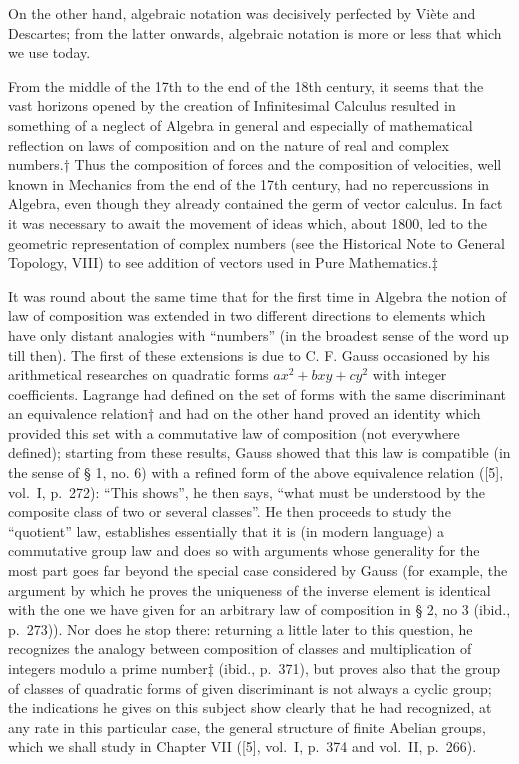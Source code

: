 On the other hand, algebraic notation was decisively perfected by Viète and Descartes; from the latter onwards, algebraic notation is more or less that which we use today.

From the middle of the 17th to the end of the 18th century, it seems that the vast horizons opened by the creation of Infinitesimal Calculus resulted in something of a neglect of Algebra in general and especially of mathematical reflection on laws of composition and on the nature of real and complex numbers.† Thus the composition of forces and the composition of velocities, well known in Mechanics from the end of the 17th century, had no repercussions in Algebra, even though they already contained the germ of vector calculus. In fact it was necessary to await the movement of ideas which, about 1800, led to the geometric representation of complex numbers (see the Historical Note to General Topology, VIII) to see addition of vectors used in Pure Mathematics.‡

It was round about the same time that for the first time in Algebra the notion of law of composition was extended in two different directions to elements which have only distant analogies with ``numbers'' (in the broadest sense of the word up till then). The first of these extensions is due to C. F. Gauss occasioned by his arithmetical researches on quadratic forms \(ax^{2} + bxy + cy^{2}\) with integer coefficients. Lagrange had defined on the set of forms with the same discriminant an equivalence relation† and had on the other hand proved an identity which provided this set with a commutative law of composition (not everywhere defined); starting from these results, Gauss showed that this law is compatible (in the sense of § 1, no. 6) with a refined form of the above equivalence relation ({[}5{]}, vol.~I, p.~272): ``This shows'', he then says, ``what must be understood by the composite class of two or several classes''. He then proceeds to study the ``quotient'' law, establishes essentially that it is (in modern language) a commutative group law and does so with arguments whose generality for the most part goes far beyond the special case considered by Gauss (for example, the argument by which he proves the uniqueness of the inverse element is identical with the one we have given for an arbitrary law of composition in § 2, no 3 (ibid., p.~273)). Nor does he stop there: returning a little later to this question, he recognizes the analogy between composition of classes and multiplication of integers modulo a prime number‡ (ibid., p.~371), but proves also that the group of classes of quadratic forms of given discriminant is not always a cyclic group; the indications he gives on this subject show clearly that he had recognized, at any rate in this particular case, the general structure of finite Abelian groups, which we shall study in Chapter VII ({[}5{]}, vol.~I, p.~374 and vol.~II, p.~266).

